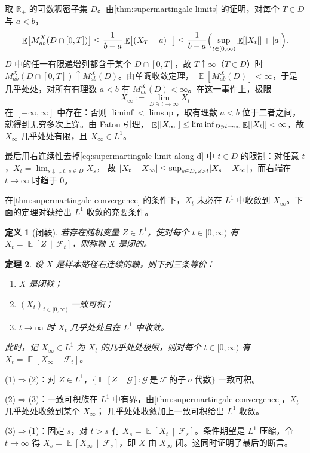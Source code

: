 \documentclass[UTF8,11pt,a4paper,oneside,fontset=fandol]{ctexrep}
\makeatletter
\numberwithin{equation}{section}
\theoremstyle{zhthm}
\newtheorem{theorem}{定理}[section]
\newtheorem{definition}[theorem]{定义}
\renewenvironment{proof}[1][\proofname]{\par
  \pushQED{\qed}%
  \normalfont\topsep6\p@\@plus6\p@\relax
  \trivlist
  \item[\hskip\labelsep\bfseries#1\hspace{0.5em}]\ignorespaces
}{%
  \popQED\endtrivlist\@endpefalse
}
\renewcommand{\proofname}{证明}
\newcommand{\R}{\mathbb{R}}
\newcommand{\F}{\mathcal{F}}
\newcommand{\G}{\mathcal{G}}
\DeclareMathOperator{\E}{\mathbb{E}}
\newcommand{\Econd}[2]{%
  \E\!\left[#1\,\middle|\,#2\right]}
\DeclarePairedDelimiter{\abs}{\lvert}{\rvert}
\makeatother
\begin{document}
\begin{proof}
取 $\R_+$ 的可数稠密子集 $D$。由\cref{thm:supermartingale-limits} 的证明，对每个 $T\in D$ 与 $a<b$，
\[
  \E\bigl[M^X_{ab}(D\cap[0,T])\bigr]\le\frac{1}{b-a}\E\bigl[(X_T-a)^-\bigr]\le\frac{1}{b-a}\Bigl(\sup_{t\in[0,\infty)}\E[\abs{X_t}]+\abs a\Bigr).
\]
$D$ 中的任一有限递增列都含于某个 $D\cap[0,T]$，故 $T\uparrow\infty$（$T\in D$）时 $M^X_{ab}(D\cap[0,T])\uparrow M^X_{ab}(D)$。由单调收敛定理，
$\E[M^X_{ab}(D)]<\infty$，于是几乎处处，对所有有理数 $a<b$ 有 $M^X_{ab}(D)<\infty$。在这一事件上，极限
\begin{equation}
  \label{eq:supermartingale-limit-along-d}
  X_\infty:=\lim_{D\ni t\to\infty}X_t
\end{equation}
在 $[-\infty,\infty]$ 中存在：否则 $\liminf<\limsup$，取有理数 $a<b$ 位于二者之间，就得到无穷多次上穿。由 Fatou 引理，
$\E[\abs{X_\infty}]\le\liminf_{D\ni t\to\infty}\E[\abs{X_t}]<\infty$，故 $X_\infty$ 几乎处处有限，且 $X_\infty\in L^1$。

最后用右连续性去掉\cref{eq:supermartingale-limit-along-d} 中 $t\in D$ 的限制：对任意 $t$，$X_t=\lim_{s\downarrow\downarrow t,\,s\in D}X_s$，
故 $\abs{X_t-X_\infty}\le\sup_{s\in D,\,s>t}\abs{X_s-X_\infty}$，而右端在 $t\to\infty$ 时趋于 $0$。
\end{proof}

在\cref{thm:supermartingale-convergence} 的条件下，$X_t$ 未必在 $L^1$ 中收敛到 $X_\infty$。下面的定理对鞅给出 $L^1$ 收敛的充要条件。

\begin{definition}[闭鞅]
\label{def:closed-martingale}
若存在随机变量 $Z\in L^1$，使对每个 $t\in[0,\infty)$ 有 $X_t=\Econd{Z}{\F_t}$，则称鞅 $X$ 是闭的。
\end{definition}

\begin{theorem}
\label{thm:closed-martingale-equivalence}
设 $X$ 是样本路径右连续的鞅，则下列三条等价：
\begin{enumerate}[label=(\arabic*)]
  \item $X$ 是闭鞅；
  \item $(X_t)_{t\in[0,\infty)}$ 一致可积；
  \item $t\to\infty$ 时 $X_t$ 几乎处处且在 $L^1$ 中收敛。
\end{enumerate}
此时，记 $X_\infty\in L^1$ 为 $X_t$ 的几乎处处极限，则对每个 $t\in[0,\infty)$ 有 $X_t=\Econd{X_\infty}{\F_t}$。
\end{theorem}

\begin{proof}
(1)$\Rightarrow$(2)：对 $Z\in L^1$，$\{\Econd{Z}{\G}:\G\ \text{是}\ \F\ \text{的子}\ \sigma\ \text{代数}\}$ 一致可积\cite[定理 4.6.1]{Durrett2019}。

(2)$\Rightarrow$(3)：一致可积族在 $L^1$ 中有界，由\cref{thm:supermartingale-convergence}，$X_t$ 几乎处处收敛到某个 $X_\infty$；
几乎处处收敛加上一致可积给出 $L^1$ 收敛\cite[定理 4.6.3]{Durrett2019}。

(3)$\Rightarrow$(1)：固定 $s$，对 $t>s$ 有 $X_s=\Econd{X_t}{\F_s}$。条件期望是 $L^1$ 压缩\cite[定理 4.1.11]{Durrett2019}，令 $t\to\infty$ 得
$X_s=\Econd{X_\infty}{\F_s}$，即 $X$ 由 $X_\infty$ 闭。这同时证明了最后的断言。
\end{proof}
\end{document}
